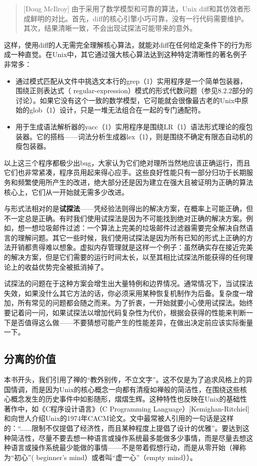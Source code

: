 \documentclass[12pt,oneside]{book}
\begin{document}
\begin{common-format}
\begin{quote}[Doug McIlroy]
由于采用了数学模型和可靠的算法，Unix diff和其仿效者形成鲜明的对比。首先，diff的核心引擎小巧可靠，没有一行代码需要维护。其次，结果清晰一致，不会出现试探法可能带来的意外。
\end{quote}

这样，使用diff的人无需完全理解核心算法，就能对diff在任何给定条件下的行为形成一种直觉。在Unix中，其它通过强大核心算法达到这种特定清晰性的著名例子非常多：

\begin{itemize}
\item 通过模式匹配从文件中挑选文本行的grep（1）实用程序是一个简单包装器，围绕正则表达式（ regular-expression）模式的形式代数问题（参见8.2.2部分的讨论）。如果它没有这个一致的数学模型，它可能就会很像最古老的Unix中原始的glob（1）设计，只是一堆无法组合在一起的专门通配符。
\item 用于生成语法解析器的yacc（1）实用程序是围绕LR（1）语法形式理论的瘦包装器。它的搭档——词法分析生成器lex（1），则是围绕不确定有限态自动机的瘦包装器。
\end{itemize}

以上这三个程序都极少出bug，大家认为它们绝对理所当然地应该正确运行，而且它们也非常紧凑，程序员用起来得心应手。这些良好性能只有一部分归功于长期服务和频繁使用所产生的改进，绝大部分还是因为建立在强大且被证明为正确的算法核心上，它们从一开始就无需多少改进。

与形式法相对的是\textbf{试探法}——凭经验法则得出的解决方案，在概率上可能正确，但不一定总是正确。有时我们使用试探法是因为不可能找到绝对正确的解决方案。例如，想一想垃圾邮件过滤：一个算法上完美的垃圾邮件过滤器需要完全解决自然语言的理解问题。其它一些时候，我们使用试探法是因为所有已知的形式上正确的方法开销都贵得难以想象。虚拟内存管理就是这样一个例子：虽然确实存在接近完美的解决方案，但是它们需要的运行时间太长，以至其相比试探法所能获得的任何理论上的收益优势完全被抵消掉了。

试探法的问题在于这种方案会增生出大量特例和边界情况。通常情况下，当试探法失效，如果没什么其它方法的话，你必须采用某种恢复机制作为后备。复杂度一增加，所有常见的问题都会随之而来。为了折衷，一开始就要小心使用试探法。始终要记着问一问，如果试探法以增加代码复杂性为代价，根据会获得的性能来判断一下是否值得这么做——不要猜想可能产生的性能差异，在做出决定前应该实际衡量一下。

\subsection{分离的价值}
本书开头，我们引用了禅的“教外别传，不立文字”。这不仅是为了追求风格上的异国情调，而是因为Unix的核心概念一向都有清瘦如禅般的简洁性，在围绕这些核心概念发生的历史事件中如影随形，熠熠生辉。这种特性也反映在Unix的基础性著作中，如《C程序设计语言》（C Programming Language）[Kemighan-Ritchiel]和向世人介绍Unix的1974年CACM论文。文中最常被人引用的一句话是这样的：“......限制不仅提倡了经济性，而且某种程度上提倡了设计的优雅”。要达到这种简洁性，尽量不要去想一种语言或操作系统最多能做多少事情，而是尽量去想这种语言或操作系统最少能做的事情——不是带着假想行动，而是从零开始（禅称为“初心”( beginner's mind）或者叫“虚一心”（empty mind））。


\end{common-format}
\end{document}
